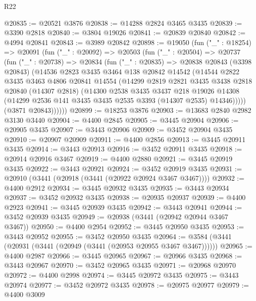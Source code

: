 \begin{lexlean}{R22}
\begin{coremodule}
@20835 := @20521 @3876
@20838 := @14288 @2824 @3465 @3435
@20839 := @3390 @2818
@20840 := @3804 @19026
@20841 := @20839 @20840
@20842 := @4994 @20841
@20843 := @3989 @20842
@20898 := @19050
    (fun ("_" : @18254) =>
    @20091
      (fun ("_" : @20092) =>
      @20503
        (fun ("_" : @20504) =>
        @20737
          (fun ("_" : @20738) =>
          @20834
            (fun ("_" : @20835) =>
            @20838
              @20843
              (@3398 @20843)
              (@14536
                @2823
                @3435
                @3464
                @138
                @20842
                @14542
                (@14544
                  @2822
                  @3435
                  @3463
                  @4806
                  @20841
                  @14554
                  (@14299
                    @2819
                    @2821
                    @3435
                    @3438
                    @2818
                    @20840
                    (@14307 @2818)
                    (@14300
                      @2538
                      @3435
                      @3437
                      @218
                      @19026
                      @14308
                      (@14299 @2536 @141 @3435 @3435 @2535 @3393 (@14307 @2535) @14346)))))
              (@3871 @20843))))))
@20899 := @18253 @3876
@20903 := @13683 @2840 @2982 @3130 @3440
@20904 := @4400 @2845
@20905 := @3445 @20904
@20906 := @20905 @3435
@20907 := @3443 @20906
@20909 := @3452 @20904 @3435
@20910 := @20907 @20909
@20911 := @4400 @2856
@20913 := @3445 @20911 @3435
@20914 := @3443 @20913
@20916 := @3452 @20911 @3435
@20918 := @20914 @20916 @3467
@20919 := @4400 @2880
@20921 := @3445 @20919 @3435
@20922 := @3443 @20921
@20924 := @3452 @20919 @3435
@20931 := @20910 (@3441 (@20918 (@3441 (@20922 @20924 @3467 @3467))))
@20932 := @4400 @2912
@20934 := @3445 @20932 @3435
@20935 := @3443 @20934
@20937 := @3452 @20932 @3435
@20938 := @20935 @20937
@20939 := @4400 @2923
@20941 := @3445 @20939 @3435
@20942 := @3443 @20941
@20944 := @3452 @20939 @3435
@20949 := @20938 (@3441 (@20942 @20944 @3467 @3467))
@20950 := @4400 @2954
@20952 := @3445 @20950 @3435
@20953 := @3443 @20952
@20955 := @3452 @20950 @3435
@20964 := @3584 (@3441 (@20931 (@3441 (@20949 (@3441 (@20953 @20955 @3467 @3467))))))
@20965 := @4400 @2987
@20966 := @3445 @20965
@20967 := @20966 @3435
@20968 := @3443 @20967
@20970 := @3452 @20965 @3435
@20971 := @20968 @20970
@20972 := @4400 @2998
@20974 := @3445 @20972 @3435
@20975 := @3443 @20974
@20977 := @3452 @20972 @3435
@20978 := @20975 @20977
@20979 := @4400 @3009

\end{coremodule}
\end{lexlean}
